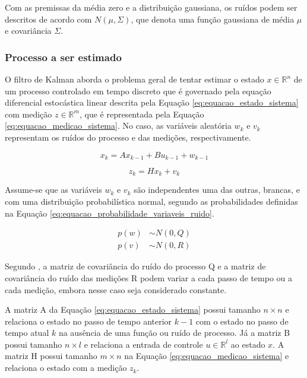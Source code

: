 \documentclass[acronym, symbols, table]{fei}
\begin{document}
				Com as premissas da média zero e a distribuição gaussiana, os ruídos podem ser descritos de acordo com $N(\mu,\Sigma)$, que denota uma função gaussiana de média $\mu$ e covariância $\Sigma$.
		
		\subsubsection{Processo a ser estimado}
		
			O filtro de Kalman aborda o problema geral de tentar estimar o estado $x \in \mathbb{R}^n$ de um processo controlado em tempo discreto que é governado pela equação diferencial estocástica linear descrita pela Equação \eqref{eq:equacao_estado_sistema} com medição $z \in \mathbb{R}^m$, que é representada pela Equação \eqref{eq:equacao_medicao_sistema}. No caso, as variáveis aleatória $w_k$ e $v_k$ representam os ruídos do processo e das medições, respectivamente.
			
			\begin{equation} \label{eq:equacao_estado_sistema}
				x_k = Ax_{k-1} + Bu_{k-1} + w_{k-1}
			\end{equation}
		
			\begin{equation} \label{eq:equacao_medicao_sistema}
				z_k = Hx_k + v_k
			\end{equation}
		
			Assume-se que as variáveis $w_k$ e $v_k$ são independentes uma das outras, brancas, e com uma distribuição probabilística normal, segundo as probabilidades definidas na Equação \eqref{eq:equacao_probabilidade_variaveis_ruido}.
			
			\begin{equation} \label{eq:equacao_probabilidade_variaveis_ruido}
				\begin{split}
					p(w) &\sim N(0, Q) \\
					p(v) &\sim N(0, R)
				\end{split}
			\end{equation}
		
			Segundo \textcite{welch1995introduction}, a matriz de covariância do ruído do processo Q e a matriz de covariância do ruído das medições R podem variar a cada passo de tempo ou a cada medição, embora nesse caso seja considerado constante.
			
			A matriz A da Equação \eqref{eq:equacao_estado_sistema} possui tamanho $n \times n$ e relaciona o estado no passo de tempo anterior $k - 1$ com o estado no passo de tempo atual $k$ na ausência de uma função ou ruído de processo. Já a matriz B possui tamanho $n \times l$ e relaciona a entrada de controle $u \in \mathbb{R}^l$ ao estado $x$. A matriz H possui tamanho $m \times n$ na Equação \eqref{eq:equacao_medicao_sistema} e relaciona o estado com a medição $z_k$.
			
\end{document}
